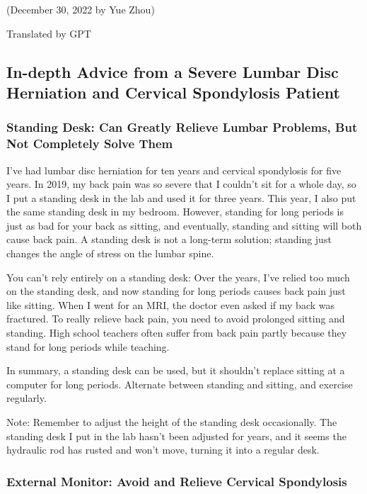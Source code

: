 \begin{flushright}
(December 30, 2022 by Yue Zhou)

Translated by GPT
\end{flushright}

\subsection{In-depth Advice from a Severe Lumbar Disc Herniation and Cervical Spondylosis Patient}

\subsubsection{Standing Desk: Can Greatly Relieve Lumbar Problems, But Not Completely Solve Them}

I've had lumbar disc herniation for ten years and cervical spondylosis for five years. In 2019, my back pain was so severe that I couldn't sit for a whole day, so I put a standing desk in the lab and used it for three years. This year, I also put the same standing desk in my bedroom. However, standing for long periods is just as bad for your back as sitting, and eventually, standing and sitting will both cause back pain. A standing desk is not a long-term solution; standing just changes the angle of stress on the lumbar spine.

You can't rely entirely on a standing desk: Over the years, I've relied too much on the standing desk, and now standing for long periods causes back pain just like sitting. When I went for an MRI, the doctor even asked if my back was fractured. To really relieve back pain, you need to avoid prolonged sitting and standing. High school teachers often suffer from back pain partly because they stand for long periods while teaching.

In summary, a standing desk can be used, but it shouldn't replace sitting at a computer for long periods. Alternate between standing and sitting, and exercise regularly.

Note: Remember to adjust the height of the standing desk occasionally. The standing desk I put in the lab hasn't been adjusted for years, and it seems the hydraulic rod has rusted and won't move, turning it into a regular desk.

\subsubsection{External Monitor: Avoid and Relieve Cervical Spondylosis}

